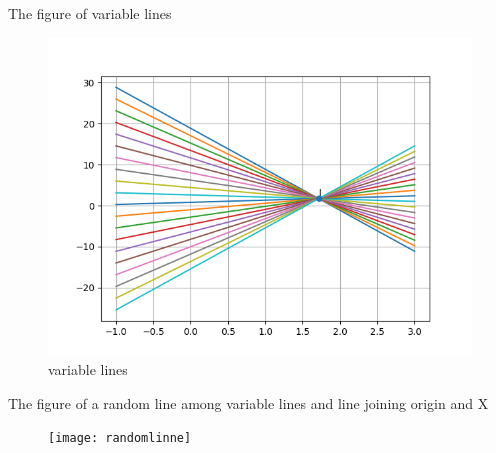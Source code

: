 \documentclass{beamer}
\begin{document}
\begin{frame}
The figure of variable lines
\begin{figure}
\includegraphics[scale=0.5]{variable_lines}
\caption{variable lines}
\end{figure}

\end{frame}
\begin{frame}
The figure of a random line among variable lines and line joining origin and X
\begin{figure}
\texttt{[image: randomlinne]}
\end{figure}
\end{frame}
\end{document}
